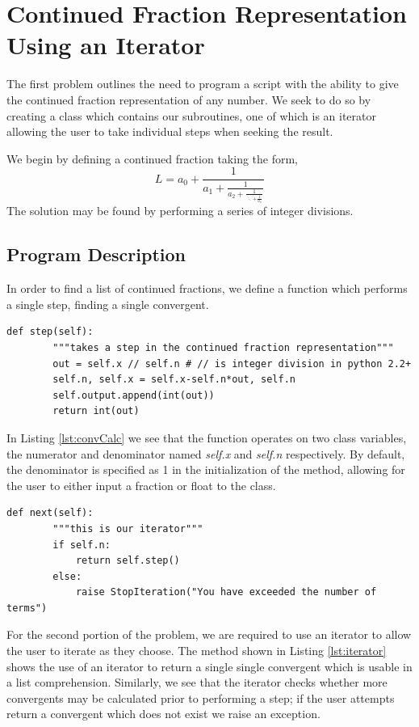 \section{Continued Fraction Representation Using an Iterator} %
\label{sec:continued_fraction_representation_using_an_iterator}
The first problem outlines the need to program a script with the ability to give the continued fraction representation of any number. We seek to do so by creating a class which contains our subroutines, one of which is an iterator allowing the user to take individual steps when seeking the result.

We begin by defining a continued fraction taking the form,
\begin{equation}
    L = a_0 + \frac{ 1 }{ a_1 + \frac{ 1 }{ a_2 + \frac{ 1 }{ \ddots + \frac{ 1 }{ a_n } } } }
\end{equation}
The solution may be found by performing a series of integer divisions.
\subsection{Program Description} %
\label{sub:program_description}
In order to find a list of continued fractions, we define a function which performs a single step, finding a single convergent.
\begin{lstlisting}[caption={Calculation of a single convergent}, label=lst:convCalc,firstnumber=8]
    def step(self):
        """takes a step in the continued fraction representation"""
        out = self.x // self.n # // is integer division in python 2.2+
        self.n, self.x = self.x-self.n*out, self.n
        self.output.append(int(out))
        return int(out)
\end{lstlisting}\noindent
In Listing \ref{lst:convCalc} we see that the function operates on two class variables, the numerator and denominator named \emph{self.x} and \emph{self.n} respectively. By default, the denominator is specified as 1 in the initialization of the method, allowing for the user to either input a fraction or float to the class. 
\begin{lstlisting}[caption={Class iterator}, label=lst:iterator,firstnumber=15]
    def next(self):
        """this is our iterator"""
        if self.n:
            return self.step()
        else:
            raise StopIteration("You have exceeded the number of terms")
\end{lstlisting}\noindent
For the second portion of the problem, we are required to use an iterator to allow the user to iterate as they choose. The method shown in Listing \ref{lst:iterator} shows the use of an iterator to return a single single convergent which is usable in a list comprehension. Similarly, we see that the iterator checks whether more convergents may be calculated prior to performing a step; if the user attempts return a convergent which does not exist we raise an exception.

